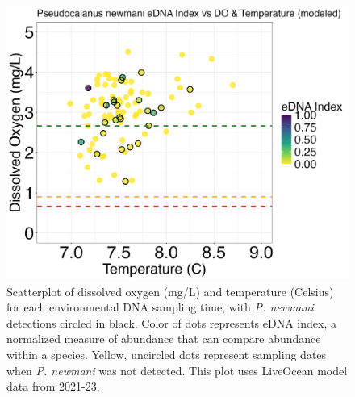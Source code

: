 \documentclass[12pt,twoside]{reedthesis}
\begin{document}
	\begin{figure}[!h]
		\begin{center}
			\includegraphics[scale=0.3]{Pnewmani_Scatter_AllYr_mod_noOut}
			\caption[\textit{P. newmani} scatterplot]{\footnotesize{Scatterplot of dissolved oxygen (mg/L) and temperature (Celsius) for each environmental DNA sampling time, with \textit{P. newmani} detections circled in black. Color of dots represents eDNA index, a normalized measure of abundance that can compare abundance within a species. Yellow, uncircled dots represent sampling dates when \textit{P. newmani} was not detected. This plot uses LiveOcean model data from 2021-23.}} %
			\label{PnewmaniScatter}
		\end{center}
	\end{figure} 
	
\end{document}
